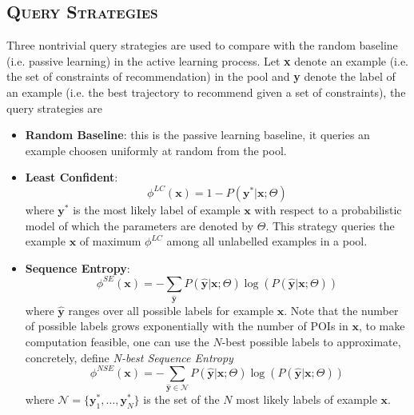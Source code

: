 \documentclass[11pt, a4paper]{article}
\begin{document}
\subsection{\textsc{Query Strategies}}
Three nontrivial query strategies are used to compare with the random baseline (i.e. passive learning) in the active learning process.
Let \textbf{x} denote an example (i.e. the set of constraints of recommendation) in the pool and 
\textbf{y} denote the label of an example (i.e. the best trajectory to recommend given a set of constraints),
the query strategies are
\begin{itemize}
\item \textbf{Random Baseline}: this is the passive learning baseline,
      it queries an example choosen uniformly at random from the pool.
\item \textbf{Least Confident}\cite{settles08}: 
      \begin{equation*}
      \phi^{LC}(\textbf{x}) = 1 - P(\textbf{y}^* \vert \textbf{x}; \Theta)
      \end{equation*}
      where $\textbf{y}^*$ is the most likely label of example $\textbf{x}$ with respect to a probabilistic model 
      of which the parameters are denoted by $\Theta$.  
      This strategy queries the example $\textbf{x}$ of maximum $\phi^{LC}$ among all unlabelled examples in a pool.
\item \textbf{Sequence Entropy}\cite{settles08}:
      \begin{equation*}
      \phi^{SE}(\textbf{x}) = - \sum_{\hat{\textbf{y}}} P(\hat{\textbf{y}} \vert \textbf{x}; \Theta) 
                                \log(P(\hat{\textbf{y}} \vert \textbf{x}; \Theta))
      \end{equation*}
      where $\hat{\textbf{y}}$ ranges over all possible labels for example $\textbf{x}$.  
      Note that the number of possible labels grows exponentially with the number of POIs in $\textbf{x}$, 
      to make computation feasible, one can use the $N$-best possible labels to approximate,
      concretely, define \textit{N-best Sequence Entropy}\cite{kim06}
      \begin{equation*}
      \phi^{NSE}(\textbf{x}) = - \sum_{\hat{\textbf{y}} \in \mathcal{N}} P(\hat{\textbf{y}} \vert \textbf{x}; \Theta) 
                                 \log(P(\hat{\textbf{y}} \vert \textbf{x}; \Theta))
      \end{equation*}
      where $\mathcal{N} = \{\textbf{y}_1^*, \dots, \textbf{y}_N^*\}$ is the set of the $N$ most likely labels of example $\textbf{x}$.  

\end{itemize}
\end{document}
